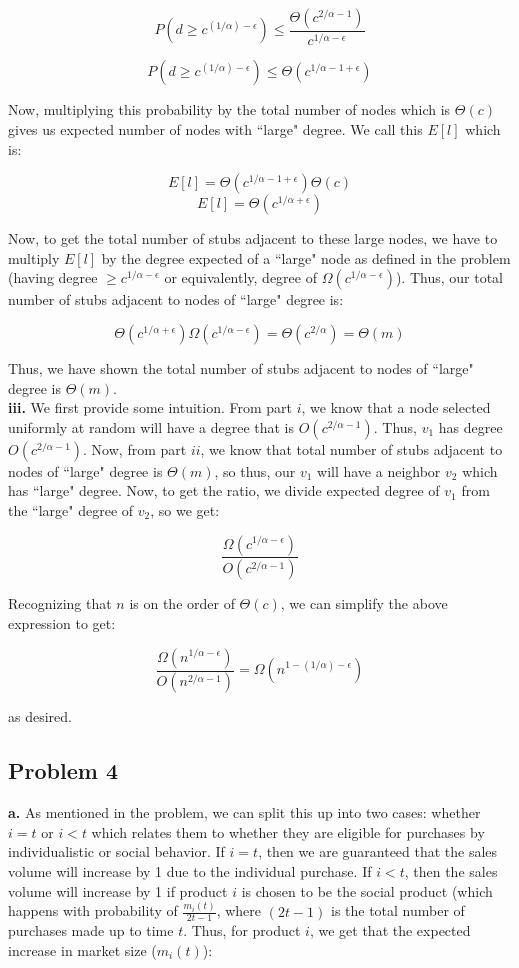 \documentclass[12 pt]{article}
\begin{document}
	\[P(d \geq c^{(1/\alpha)-\epsilon}) \leq \frac{\Theta(c^{2/\alpha - 1})}{c^{1/\alpha - \epsilon}}\]
	
	\[P(d \geq c^{(1/\alpha) -\epsilon}) \leq \Theta(c^{1/\alpha - 1 + \epsilon})\]
	
	\noindent Now, multiplying this probability by the total number of nodes which is $\Theta(c)$ gives us expected number of nodes with ``large" degree. We call this $E[l]$ which is:
	
	\[E[l] = \Theta(c^{1/\alpha - 1 + \epsilon}) \Theta(c)\]
	\[E[l] = \Theta(c^{1/\alpha + \epsilon})\]
	
	\noindent Now, to get the total number of stubs adjacent to these large nodes, we have to multiply $E[l]$ by the degree expected of a ``large" node as defined in the problem (having degree $\geq c^{1/\alpha - \epsilon}$ or equivalently, degree of $\Omega(c^{1/\alpha - \epsilon})$). Thus, our total number of stubs adjacent to nodes of ``large" degree is:
	
	\[\Theta(c^{1/\alpha + \epsilon}) \Omega (c^{1/\alpha - \epsilon} ) = \Theta(c^{2/\alpha}) = \Theta(m)\]
	
	\noindent Thus, we have shown the total number of stubs adjacent to nodes of ``large" degree is $\Theta(m)$.\\
	
	\noindent \textbf {iii.} We first provide some intuition. From part $i$, we know that a node selected uniformly at random will have a degree that is $O(c^{2/\alpha - 1})$. Thus, $v_1$ has degree $O(c^{2/\alpha - 1})$. Now, from part $ii$, we know that total number of stubs adjacent to nodes of ``large" degree is $\Theta(m)$, so thus, our $v_1$ will have a neighbor $v_2$ which has ``large" degree. Now, to get the ratio, we divide expected degree of $v_1$ from the ``large" degree of $v_2$, so we get:
	
	\[\frac{\Omega(c^{1/\alpha - \epsilon})}{O(c^{2/\alpha - 1})}\]
	
	\noindent Recognizing that $n$ is on the order of $\Theta(c)$, we can simplify the above expression to get:
	
	\[\frac{\Omega(n^{1/\alpha - \epsilon})} {O(n^{2/\alpha - 1})} = \Omega(n^{1-(1/\alpha) - \epsilon})\]
	
	\noindent as desired.
	
	\subsection*{Problem 4}
	\noindent \textbf {a.} As mentioned in the problem, we can split this up into two cases: whether $i = t$ or $i < t$ which relates them to whether they are eligible for purchases by individualistic or social behavior. If $i = t$, then we are guaranteed that the sales volume will increase by 1 due to the individual purchase. If $i < t$, then the sales volume will increase by 1 if product $i$ is chosen to be the social product (which happens with probability of $\frac{m_i(t)}{2t-1}$, where $(2t-1)$ is the total number of purchases made up to time $t$. Thus, for product $i$, we get that the expected increase in market size ($m_i(t)$): 
	
\end{document}
